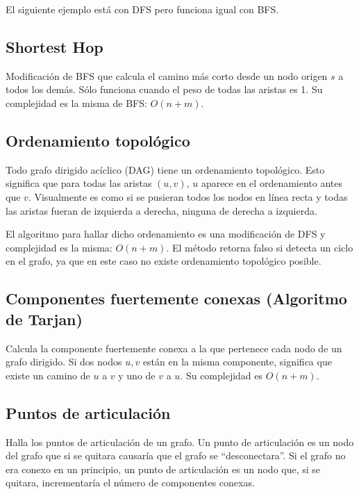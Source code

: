\documentclass{article}
\begin{document}
\begin{multicols}{2}
	El siguiente ejemplo está con DFS pero funciona igual con BFS.	
	

	\subsection{Shortest Hop}
	Modificación de BFS que calcula el camino más corto desde un nodo origen \( s \) a todos los demás. Sólo funciona cuando el peso de todas las aristas es 1. Su complejidad es la misma de BFS: \( O(n + m) \).
	
	
	\subsection{Ordenamiento topológico}
	Todo grafo dirigido acíclico (DAG) tiene un ordenamiento topológico. Esto significa que para todas las aristas \( (u,v) \), \(u\) aparece en el ordenamiento antes que \(v\). Visualmente es como si se pusieran todos los nodos en línea recta y todas las aristas fueran de izquierda a derecha, ninguna de derecha a izquierda. 
	
	El algoritmo para hallar dicho ordenamiento es una modificación de DFS y complejidad es la misma: \( O(n + m) \). El método retorna falso si detecta un ciclo en el grafo, ya que en este caso no existe ordenamiento topológico posible.
	
	
	\subsection{Componentes fuertemente conexas (Algoritmo de Tarjan)}
	Calcula la componente fuertemente conexa a la que pertenece cada nodo de un grafo dirigido. Si dos nodos \( u, v \) están en la misma componente, significa que existe un camino de \( u \) a \( v \) y uno de \( v \) a \( u \). Su complejidad es \( O(n + m) \).
	
	
	\subsection{Puntos de articulación}
	Halla los puntos de articulación de un grafo. Un punto de articulación es un nodo del grafo que si se quitara causaría que el grafo se ``desconectara''. Si el grafo no era conexo en un principio, un punto de articulación es un nodo que, si se quitara, incrementaría el número de componentes conexas. 
	

\end{multicols}
\end{document}
